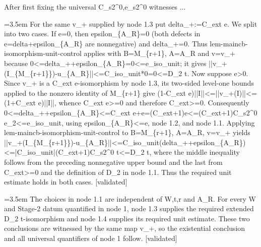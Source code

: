 \documentclass{article}
\newcommand{\step}[1]{\par\noindent\hangindent=3.5em\hangafter=1%
  \makebox[3.5em][l]{\textbf{#1.}}}
\newcommand{\steptag}[1]{\hfill{\small\textsf{[#1]}}}
\begin{document}
\begin{proofbox}{After first fixing the universal C\_s2\textasciicircum{}0,e\_s2\textasciicircum{}0 witnesses ...}
\step{1.4} For the same v\_+ supplied by node 1.3 put delta\_+:=C\_ext e. We split into two cases. If e=0, then epsilon\_\{A\_R\}=0 (both defects in e=delta+epsilon\_\{A\_R\} are nonnegative) and delta\_+=0. Thus lem-maincb-isomorphism-unit-control applies with B=M\_\{r+1\}, A=A\_R and v=v\_+ because 0<=delta\_++epsilon\_\{A\_R\}=0<=e\_iso\_unit; it gives ||v\_+(I\_\{M\_\{r+1\}\})-u\_\{A\_R\}||<=C\_iso\_unit*0=0<=D\_2 t. Now suppose e>0. Since v\_+ is a C\_ext e-isomorphism by node 1.3, its two-sided level-one bounds applied to the nonzero identity of M\_\{r+1\} give (1-C\_ext e)||I||<=||v\_+(I)||<=(1+C\_ext e)||I||, whence C\_ext e>=0 and therefore C\_ext>=0. Consequently 0<=delta\_++epsilon\_\{A\_R\}<=C\_ext e+e=(C\_ext+1)e<=(C\_ext+1)C\_s2\textasciicircum{}0 e\_2<=e\_iso\_unit, using epsilon\_\{A\_R\}<=e, node 1.2, and node 1.1. Applying lem-maincb-isomorphism-unit-control to B=M\_\{r+1\}, A=A\_R, v=v\_+ yields ||v\_+(I\_\{M\_\{r+1\}\})-u\_\{A\_R\}||<=C\_iso\_unit(delta\_++epsilon\_\{A\_R\})<=|C\_iso\_unit|(C\_ext+1)C\_s2\textasciicircum{}0 t<=D\_2 t, where the middle inequality follows from the preceding nonnegative upper bound and the last from C\_ext>=0 and the definition of D\_2 in node 1.1. Thus the required unit estimate holds in both cases. \steptag{validated} \\[4pt]
\step{1.5} The choices in node 1.1 are independent of W,t,r and A\_R. For every W and Stage-2 datum quantified in node 1, node 1.3 supplies the required extended D\_2 t-isomorphism and node 1.4 supplies its required unit estimate. These two conclusions are witnessed by the same map v\_+, so the existential conclusion and all universal quantifiers of node 1 follow. \steptag{validated} \\[4pt]
\end{proofbox}
\end{document}
